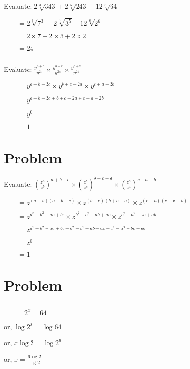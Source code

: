 \documentclass{report}
\begin{document}
\subsection{}
Evaluate: $2\sqrt[3]{343}+2\sqrt[5]{243}-12\sqrt[6]{64}$

$\quad\quad =2\sqrt[3]{7^3}+2\sqrt[5]{3^5}-12\sqrt[6]{2^6}$

$\quad\quad =2\times7+2\times3+2\times2$

$\quad\quad = 24$

\subsection{}
Evaluate: $\frac{y^{a+b}}{y^{2c}}\times\frac{y^{b+c}}{y^{2a}}\times\frac{y^{c+a}}{y^{2b}}$

$\quad\quad = y^{a+b-2c}\times y^{b+c-2a}\times y^{c+a-2b}$

$\quad\quad = y^{a+b-2c+b+c-2a+c+a-2b}$

$\quad\quad = y^{0}$

$\quad\quad = 1$

\section{Problem}

Evaluate: $\left(\frac{z^a}{z^b}\right)^{a+b-c}\times\left(\frac{z^b}{z^c}\right)^{b+c-a}\times\left(\frac{z^a}{z^a}\right)^{c+a-b}$

$\quad\quad = z^{(a-b)(a+b-c)}\times z^{(b-c)(b+c-a)}\times z^{(c-a)(c+a-b)}$

$\quad\quad = z^{a^2-b^2-ac+bc}\times z^{b^2-c^2-ab+ac}\times z^{c^2-a^2-bc+ab}$

$\quad\quad =z^{a^2-b^2-ac+bc+b^2-c^2-ab+ac+c^2-a^2-bc+ab}$

$\quad\quad =z^{0}$

$\quad\quad = 1$

\section{Problem}
\subsection{}
$\quad\quad\quad2^x = 64$

or, $\log 2^x = \log64$

or, $x\log 2 = \log 2^{6}$

or, $x = \frac{6\log2}{\log2}$
\end{document}
